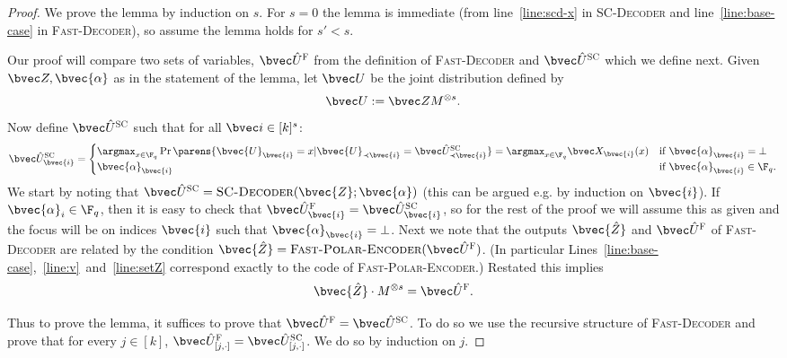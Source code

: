 \documentclass[11pt]{article}
\begin{document}
\begin{proof}
	We prove the lemma by induction on $s$. For $s=0$ the lemma is immediate (from line~\ref{line:scd-x} in \textsc{SC-Decoder} and line~\ref{line:base-case} in \textsc{Fast-Decoder}), so assume the lemma holds for $s'<s$.
	
	Our proof will compare two sets of variables, $\UF$ from the definition of \textsc{Fast-Decoder} and $\USC$ which we define next. 
	Given $\bvec Z, \bvec{\alpha}$ as in the statement of the lemma, 
	let $\bvec U$ be the joint distribution defined by 
	\[\bvec U := \bvec Z M^{\otimes s}.\]
	Now define $\USC$ such that for all $\bvec i \in [k]^s$:
	\begin{equation}
		\label{eqn:u-est}
		\USC_\bvec{i} =
		\begin{cases}
			\argmax_{x \in \F_q}\Pr\parens{\bvec{U}_\bvec{i} = x |
				\bvec{U}_{\prec \bvec{i}}
				= \USC_{\prec \bvec{i}}}  = \argmax_{x \in \F_q} \bvec X_{\bvec{i}}(x) & \text{if $\bvec{\alpha}_{\bvec{i}} =\bot$}\\
			\bvec{\alpha}_\bvec{i} & \text{if $\bvec{\alpha}_{\bvec{i}}\in \F_q$}.
		\end{cases}
	\end{equation}
	We start by noting that $\USC =\textsc{SC-Decoder}(\bvec{Z}; \bvec{\alpha})$ (this can be argued e.g. by induction on $\bvec{i}$). If $\bvec{\alpha}_i \in \F_q$, then it is easy to check that $\UF_{\bvec{i}}=\USC_\bvec{i}$, so for the rest of the proof we will assume this as given and the focus will be on indices $\bvec{i}$ such that $\bvec{\alpha}_{\bvec{i}} =\bot$.
	Next we note that the outputs $\bvec{\hat{Z}}$ and $\UF$ of \textsc{Fast-Decoder} are related by the condition $\bvec{\hat{Z}} = \textsc{Fast-Polar-Encoder}(\UF)$. 
	(In particular Lines~\ref{line:base-case},~\ref{line:v}~and~\ref{line:setZ} correspond exactly to the code of \textsc{Fast-Polar-Encoder}.) 
	Restated this implies 
	\begin{equation}
		\label{eqn:vhat-prelim}
		\bvec{\hat Z} \cdot M^{\otimes s}
		= \UF.
	\end{equation}
	
	
	Thus to prove the lemma, it suffices to prove that $\UF = \USC$. To do so we use the recursive structure of \textsc{Fast-Decoder} and prove that for every 
	$j \in [k]$, $\UF_{[j,\cdot]} = \USC_{[j,\cdot]}$. We do so by induction on $j$. 
	

\end{proof}
\end{document}
